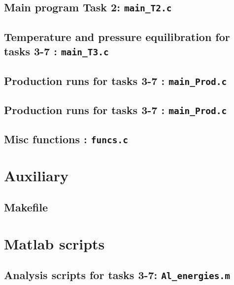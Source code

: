 \subsection{Main program  Task 2: \texttt{main\_T2.c}}


\subsection{Temperature and pressure equilibration for tasks 3-7 : \texttt{main\_T3.c}}


\subsection{Production runs for tasks 3-7 : \texttt{main\_Prod.c}}


\subsection{Production runs for tasks 3-7 : \texttt{main\_Prod.c}}



\subsection{Misc functions : \texttt{funcs.c}}


\section{Auxiliary }
\subsection{Makefile}




\section{Matlab scripts}
\subsection{Analysis scripts for tasks 3-7: \texttt{Al\_energies.m}}


